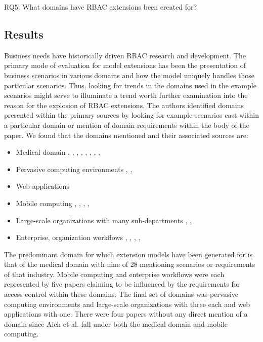 RQ5: What domains have RBAC extensions been created for?

\subsection{Results}

Business needs have historically driven RBAC research and development.  The primary mode of evaluation for
model extensions has been the presentation of business scenarios in various domains and how the model
uniquely handles those particular scenarios.  Thus, looking for trends in the domains used in the example
scenarios might serve to illuminate a trend worth further examination into the reason for the explosion of
RBAC extensions.  The authors identified domains presented within the primary sources by looking for example
scenarios cast within a particular domain or mention of domain requirements within the body of the paper.
We found that the domains mentioned and their associated sources are:

\begin{itemize}
\setlength{\itemsep}{0.25pt}
\item Medical domain \cite{alam06:constraint}, \cite{tzelepi01:flexible}, \cite{motta03:contextual}, \cite{ni2010privacy}, \cite{damiani2007geo}, \cite{hansen2003spatial}, \cite{samuel07:spatio-temporal}, \cite{aich09:role}, \cite{zhou2007team}
\item Pervasive computing environments \cite{huang06:pervasive}, \cite{chen08:spatio-temporal}, \cite{ray07:spatio}
\item Web applications \cite{masoumzadeh2008purbac}
\item Mobile computing \cite{thein2011leveraging}, \cite{zou2009crbac}, \cite{chandran05:llt}, \cite{ray07:spatio}, \cite{aich09:role}
\item Large-scale organizations with many sub-departments \cite{yamazaki04:designing}, \cite{han08:extended}, \cite{yao2008task}
\item Enterprise, organization workflows \cite{cholewka00:acontext-sensitive}, \cite{bao08:role}, \cite{zhang06:collaborative}, \cite{oh2003task}, \cite{joshi05:generalized}
\end{itemize}

The predominant domain for which extension models have been generated for is that of the medical domain with nine of 28 mentioning scenarios or requirements of that industry.
Mobile computing and enterprise workflows were each represented by five papers claiming to be influenced by the requirements for access control within these domains. The final set
of domains was pervasive computing environments and large-scale organizations with three each and web applications with one.  There were four papers without any direct mention of a domain
since Aich et al. \cite{aich09:role} fall under both the medical domain and mobile computing.

